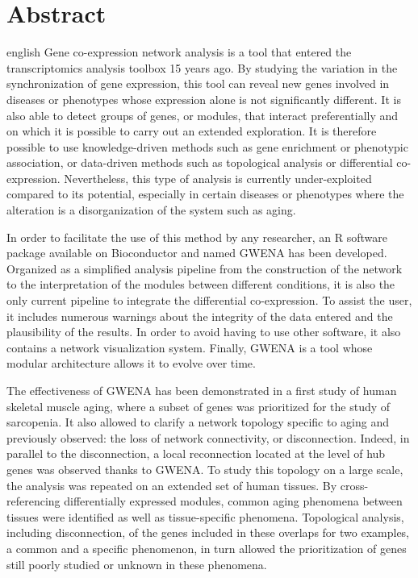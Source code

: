 \chapter*{Abstract}                      %

\begin{otherlanguage*}{english}
Gene co-expression network analysis is a tool that entered the transcriptomics analysis toolbox 15 years ago. By studying the variation in the synchronization of gene expression, this tool can reveal new genes involved in diseases or phenotypes whose expression alone is not significantly different. It is also able to detect groups of genes, or modules, that interact preferentially and on which it is possible to carry out an extended exploration. It is therefore possible to use knowledge-driven methods such as gene enrichment or phenotypic association, or data-driven methods such as topological analysis or differential co-expression. Nevertheless, this type of analysis is currently under-exploited compared to its potential, especially in certain diseases or phenotypes where the alteration is a disorganization of the system such as aging. 

In order to facilitate the use of this method by any researcher, an R software package available on Bioconductor and named GWENA has been developed. Organized as a simplified analysis pipeline from the construction of the network to the interpretation of the modules between different conditions, it is also the only current pipeline to integrate the differential co-expression. To assist the user, it includes numerous warnings about the integrity of the data entered and the plausibility of the results. In order to avoid having to use other software, it also contains a network visualization system. Finally, GWENA is a tool whose modular architecture allows it to evolve over time.

The effectiveness of GWENA has been demonstrated in a first study of human skeletal muscle aging, where a subset of genes was prioritized for the study of sarcopenia. It also allowed to clarify a network topology specific to aging and previously observed: the loss of network connectivity, or disconnection. Indeed, in parallel to the disconnection, a local reconnection located at the level of hub genes was observed thanks to GWENA. To study this topology on a large scale, the analysis was repeated on an extended set of human tissues. By cross-referencing differentially expressed modules, common aging phenomena between tissues were identified as well as tissue-specific phenomena. Topological analysis, including disconnection, of the genes included in these overlaps for two examples, a common and a specific phenomenon, in turn allowed the prioritization of genes still poorly studied or unknown in these phenomena.


\end{otherlanguage*}
